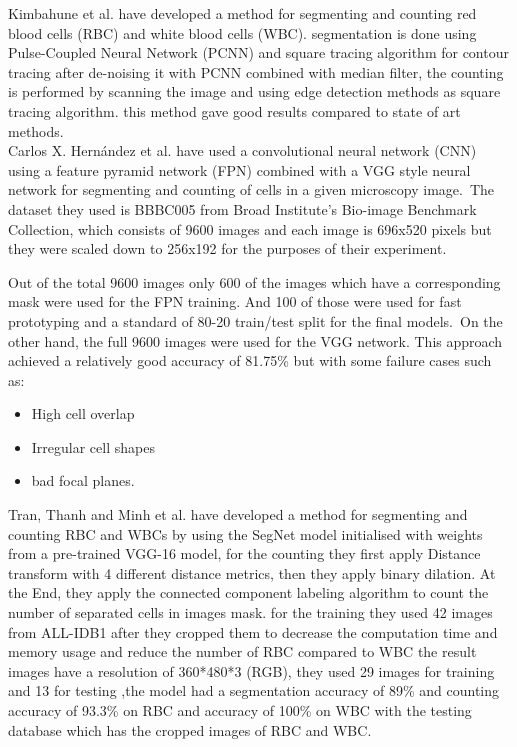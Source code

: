 \documentclass[conference]{IEEEtran}
\begin{document}
Kimbahune et al. \cite{kimbahune2011blood} have developed a method for segmenting and counting red blood cells (RBC) and white blood cells (WBC).
segmentation is done using Pulse-Coupled Neural Network (PCNN) and square tracing algorithm for contour tracing after de-noising it with PCNN combined with median filter, the counting is performed by scanning the image and using edge detection methods as square tracing algorithm. this method gave good results compared to state of art methods.\\

Carlos X. Hern{\'{a}}ndez et al. \cite{DBLP:journals/corr/abs-1802-10548} have used a convolutional neural network (CNN) using a feature pyramid network (FPN) combined with a VGG style neural network for segmenting and counting of cells in a given microscopy image.\
The dataset they used is BBBC005 \cite{ljosa2012annotated} from Broad Institute's Bio-image Benchmark Collection, which consists of 9600 images and each image is 696x520 pixels but they were scaled down to 256x192 for the purposes of their experiment.\

Out of the total 9600 images only 600 of the images which have a corresponding mask were used for the FPN training. And 100 of those were used for fast prototyping and a standard of 80-20 train/test split for the final models.\
On the other hand, the full 9600 images were used for the VGG network.
This approach achieved a relatively good accuracy of 81.75\% but with some failure cases such as:\

\begin{itemize}
  \item High cell overlap
  \item Irregular cell shapes
  \item bad focal planes.
\end{itemize}

Tran, Thanh and Minh et al. \cite{tran2019blood} have developed a method for segmenting and counting RBC and WBCs by using the SegNet model initialised with weights from a pre-trained VGG-16 model, for the counting they first apply Distance transform with 4 different distance metrics, then they apply binary dilation. At the End, they apply the connected component labeling algorithm to count the number of separated cells in images mask. for the training they used 42 images from ALL-IDB1 \cite{labati2011all} after they cropped them to decrease the computation time and memory usage and reduce the number of RBC compared to WBC the result images have a resolution of 360*480*3 (RGB), they used 29 images for training and 13 for testing ,the model had a segmentation accuracy of 89\% and counting accuracy of 93.3\% on RBC and accuracy of 100\% on WBC with the testing database which has the cropped images of RBC and WBC.\
\end{document}
